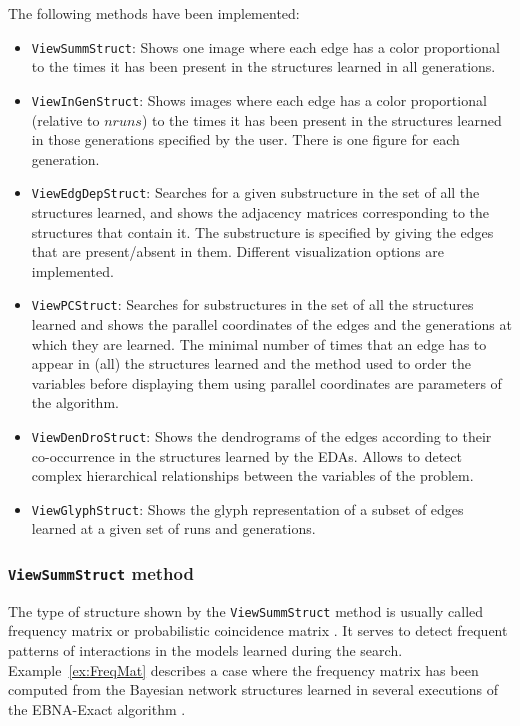 \documentclass[a4paper]{article}
\begin{document}
The following methods have been implemented:

\begin{itemize}
 \item \texttt{ViewSummStruct}: Shows one image where each edge has a color proportional
  to the times it has been present in the structures learned in all
  generations.
 \item \texttt{ViewInGenStruct}: Shows images where each edge has a color proportional
 (relative to $nruns$)
  to the times it has been present in the structures
  learned in those generations specified by the user. There is one figure for each generation.
 \item \texttt{ViewEdgDepStruct}: Searches for a given substructure in the set of all the
  structures learned,
 and shows the adjacency matrices corresponding to the structures that contain it.
 The substructure is specified by giving  the edges that are present/absent in them.
 Different visualization options are implemented.
 \item \texttt{ViewPCStruct}: Searches for substructures in the set of all the structures learned
 and shows the parallel coordinates of the edges and the generations at which they are learned.
 The minimal number of times that an edge has to appear in (all) the
structures learned and the method used to order the variables before
displaying them using  parallel coordinates are parameters of the
algorithm.
\item \texttt{ViewDenDroStruct}: Shows the dendrograms of the edges according to
                       their co-occurrence in the structures learned by
                       the EDAs. Allows to detect complex hierarchical
                       relationships between the variables of the problem.

\item \texttt{ViewGlyphStruct}: Shows the glyph representation of a subset of edges
learned at a given set of runs and generations.
\end{itemize}

\subsubsection{\texttt{ViewSummStruct} method}

 The type of structure shown by the \texttt{ViewSummStruct} method is usually called frequency
  matrix \cite{Echegoyen_et_al:2007,Echegoyen_et_al:2008,Santana_et_al:2007b} or probabilistic coincidence matrix \cite{Hauschild_et_al:2007}.
 It serves to detect frequent patterns  of interactions in the models learned during
 the search. Example~\ref{ex:FreqMat} describes a case where the
 frequency matrix has been computed from the Bayesian network
 structures learned in several executions of the EBNA-Exact
 algorithm  \cite{Echegoyen_et_al:2007,Echegoyen_et_al:2008}.
\end{document}
